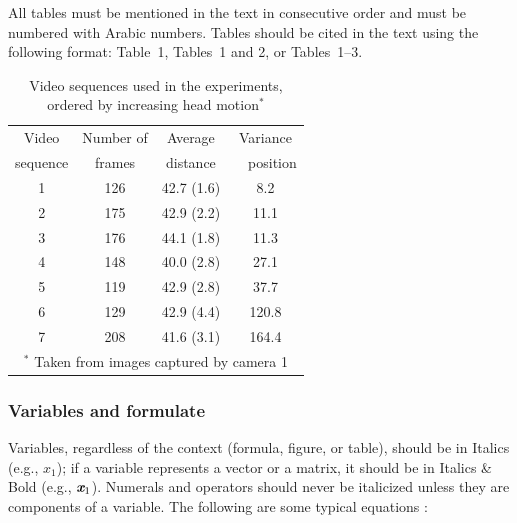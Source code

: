 \documentclass[twoside,twocolumn]{article}
\begin{document}
All tables must be mentioned in the text in consecutive order and must be numbered with Arabic numbers. Tables should be cited in the text using the following format: Table~1, Tables~1 and 2, or Tables~1--3.


\begin{table}[thp]\footnotesize
\caption{Video sequences used in the experiments, ordered by
increasing head motion$^\textbf{*}$ \citep{Deniz10}}\label{Table:1}
\centering
\begin{tabular*}{7.9cm}{@{\qquad}c@{\qquad}c@{\qquad}c@{\qquad}c@{\qquad}}
\toprule[0.75pt]
Video  & Number of & Average    & Variance \\
sequence       & frames    & distance & \ \ position \\
\midrule[0.5pt]
1     & 126    & 42.7 (1.6)                           & 8.2                       \\
2     & 175    & 42.9 (2.2)                           & 11.1                      \\
3     & 176    & 44.1 (1.8)                           & 11.3                      \\
4     & 148    & 40.0 (2.8)                           & 27.1                      \\
5     & 119    & 42.9 (2.8)                           & 37.7                      \\
6     & 129    & 42.9 (4.4)                           & 120.8                      \\
7     & 208    & 41.6 (3.1)                           & 164.4                      \\
\bottomrule[0.75pt]
\multicolumn{4}{p{7.6cm}}{\scriptsize $^*$ Taken from
images captured by camera 1}
\end{tabular*}
\end{table}

\subsubsection{Variables and formulate}

Variables, regardless of the context (formula, figure, or table), should be in Italics (e.g., $x_1$); if a variable represents a vector or a matrix, it should be in Italics \& Bold (e.g., $\emph{\textbf{x}}_1$). Numerals and operators should never be italicized unless they are components of a variable. The following are some typical equations \citep{Theodoridis11}:
\end{document}
